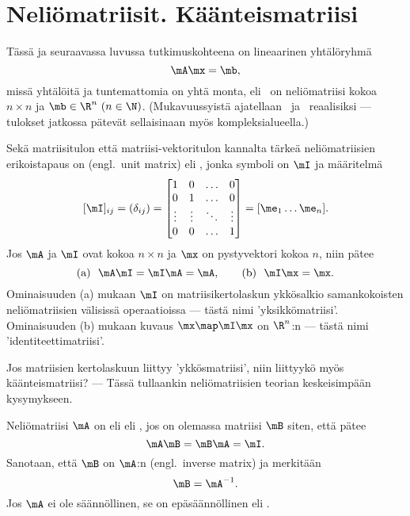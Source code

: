 \section{Neliömatriisit. Käänteismatriisi} \label{inverssi}
\alku
{}

Tässä ja seuraavassa luvussa tutkimuskohteena on lineaarinen yhtälöryhmä
\[
\mA \mx = \mb,
\]
missä yhtälöitä ja tuntemattomia on yhtä monta, eli \mA\ on neliömatriisi kokoa $n \times n$ ja
$\mb \in \R^n\ (n \in \N)$. (Mukavuussyistä ajatellaan \mA\ ja \mb\ reaalisiksi --- tulokset 
jatkossa pätevät sellaisinaan myös kompleksialueella.)

Sekä matriisitulon että matriisi-vektoritulon kannalta tärkeä neliömatriisien erikoistapaus on
 (engl.\ unit matrix) eli , jonka symboli on
$\mI$ ja määritelmä
\[
[\mI]_{ij} = (\delta_{ij}) 
           = \begin{bmatrix} 
             1&0&\ldots&0 \\ 0&1&\ldots&0\\ \vdots&\vdots&\ddots&\vdots \\ 0&0&\ldots&1 
             \end{bmatrix} 
           = [\me_1 \ldots \me_n].
\]
Jos $\mA$ ja $\mI$ ovat kokoa $n \times n$ ja $\mx$ on pystyvektori kokoa $n$, niin pätee
\[
\text{(a)}\ \ \mA\mI=\mI\mA=\mA, \qquad \text{(b)}\ \ \mI\mx=\mx.
\]
Ominaisuuden (a) mukaan $\mI$ on matriisikertolaskun ykkösalkio samankokoisten neliömatriisien 
välisissä operaatioissa --- tästä nimi 'yksikkömatriisi'. Ominaisuuden (b) mukaan kuvaus 
$\mx \map \mI \mx$ on $\R^n$:n  --- tästä nimi 'identiteettimatriisi'.

Jos matriisien kertolaskuun liittyy 'ykkösmatriisi', niin liittyykö myös käänteismatriisi? 
--- Tässä tullaankin neliömatriisien teorian keskeisimpään kysymykseen.
\begin{Def} \label{käänteismatriisin määritelmä} 
 
 
Neliömatriisi $\mA$ on  eli  eli , jos on
olemassa matriisi $\mB$ siten, että pätee
\[
\mA \mB = \mB \mA = \mI.
\]
Sanotaan, että $\mB$ on $\mA$:n  (engl.\ inverse matrix) ja merkitään
\[
\mB = \mA^{-1}.
\]
Jos $\mA$ ei ole säännöllinen, se on epäsäännöllinen eli .
\end{Def}

